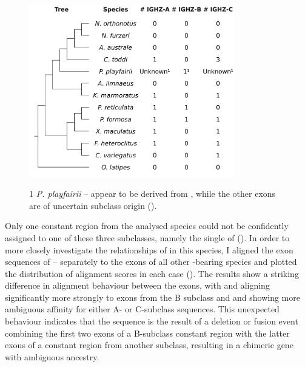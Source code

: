 \begin{figure}
\centering
\includegraphics[width=0.8\textwidth]{_Figures/png/multispecies-cz-subclasses}
\begin{minipage}{0.7\textwidth}
\footnotesize
\begin{threeparttable}
\begin{tablenotes}
\item[1] \textit{P. playfairii}  -- appear to be derived from , while the other exons are of uncertain subclass origin ().
\end{tablenotes}
\end{threeparttable}
\end{minipage}
\label{fig:multispecies-cz-subclasses}
\end{figure}


Only one  constant region from the analysed species could not be confidently assigned to one of these three subclasses, namely the single  of  (). In order to more closely investigate the relationships of  in this species, I aligned the exon sequences of  -- separately to the \cz{} exons of all other -bearing species and plotted the distribution of alignment scores in each case (). The results show a striking difference in alignment behaviour between the exons, with  and  aligning significantly more strongly to exons from the B subclass and  and  showing more ambiguous affinity for either A- or C-subclass sequences. This unexpected behaviour indicates that the   sequence is the result of a deletion or fusion event combining the first two exons of a B-subclass  constant region with the latter exons of a constant region from another subclass, resulting in a chimeric gene with ambiguous ancestry.

